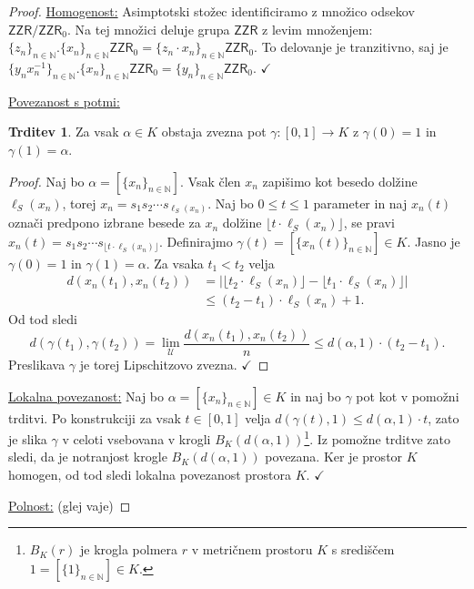 \documentclass[11pt]{book}
\def\NN{\mathbb{N}}
\def\UU{\mathcal{U}}
\def\ZR{\mathsf{ZZR}}
\def\literatura{\color{modra}}
\def\vaje{{\literatura (glej vaje)}}
\def\kljuka{$\checkmark$}
\theoremstyle{definition}
\theoremstyle{zgled}
\theoremstyle{odprtproblem}
\theoremstyle{domacanaloga}
\newenvironment{dokaz}
    {\color{siva}\begin{proof}}
    {\end{proof}}
\theoremstyle{izrek}
\newtheorem*{trditev}{Trditev}
\begin{document}
\begin{dokaz}
\underline{Homogenost:} Asimptotski stožec identificiramo z množico odsekov $\ZR/\ZR_0$. Na tej množici deluje grupa $\ZR$ z levim množenjem: $\{ z_n \}_{n \in \NN}. \{ x_n \}_{n \in \NN}\ZR_0 = \{ z_n \cdot x_n \}_{n \in \NN} \ZR_0$. To delovanje je tranzitivno, saj je $\{ y_n x_n^{-1} \}_{n \in \NN}. \{ x_n \}_{n \in \NN}\ZR_0 = \{ y_n \}_{n \in \NN} \ZR_0$. \kljuka

\underline{Povezanost s potmi:} 

\begin{trditev}
Za vsak $\alpha \in K$ obstaja zvezna pot $\gamma \colon [0,1] \to K$ z $\gamma(0) = 1$ in $\gamma(1) = \alpha$.
\end{trditev}

\begin{dokaz}
Naj bo $\alpha = [\{ x_n \}_{n \in \NN}]$. Vsak člen $x_n$ zapišimo kot besedo dolžine $\ell_S(x_n)$, torej $x_n = s_1 s_2 \cdots s_{\ell_S(x_n)}$. Naj bo $0 \leq t \leq 1$ parameter in naj $x_n(t)$ označi predpono izbrane besede za $x_n$ dolžine $\lfloor t \cdot \ell_S(x_n) \rfloor$, se pravi $x_n(t) = s_1 s_2 \cdots s_{\lfloor t \cdot \ell_S(x_n) \rfloor}$. Definirajmo $\gamma(t) = [\{ x_n(t) \}_{n \in \NN}] \in K$. Jasno je $\gamma(0) = 1$ in $\gamma(1) = \alpha$. Za vsaka $t_1 < t_2$ velja
\begin{align*}
d(x_n(t_1), x_n(t_2)) &= \left| \lfloor t_2 \cdot \ell_S(x_n) \rfloor - \lfloor t_1 \cdot \ell_S(x_n) \rfloor \right| \\
&\leq (t_2 - t_1) \cdot \ell_S(x_n) + 1.
\end{align*}
Od tod sledi
\[
d(\gamma(t_1), \gamma(t_2)) = \lim_\UU \frac{d(x_n(t_1), x_n(t_2))}{n} 
\leq d(\alpha, 1) \cdot (t_2 - t_1).
\]
Preslikava $\gamma$ je torej Lipschitzovo zvezna. \kljuka
\end{dokaz}


\underline{Lokalna povezanost:} Naj bo $\alpha = [\{ x_n \}_{n \in \NN}] \in K$ in naj bo $\gamma$ pot kot v pomožni trditvi. Po konstrukciji za vsak $t \in [0,1]$ velja $d(\gamma(t), 1) \leq d(\alpha, 1) \cdot t$, zato je slika $\gamma$ v celoti vsebovana v krogli $B_K(d(\alpha, 1))$\footnote{$B_K(r)$ je krogla polmera $r$ v metričnem prostoru $K$ s središčem $1 = [\{ 1 \}_{n \in \NN}] \in K$.}. Iz pomožne trditve zato sledi, da je notranjost krogle $B_K(d(\alpha, 1))$ povezana. Ker je prostor $K$ homogen, od tod sledi lokalna povezanost prostora $K$. \kljuka

\underline{Polnost:} \vaje
\end{dokaz}
\end{document}
